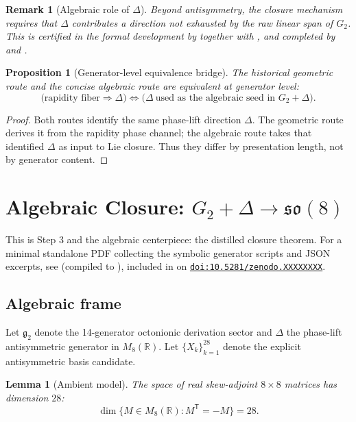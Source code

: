 \documentclass[11pt]{amsart}
\newtheorem{lemma}[theorem]{Lemma}
\newtheorem{proposition}[theorem]{Proposition}
\newtheorem{remark}[theorem]{Remark}
\newcommand{\PaperZenodoDoi}{10.5281/zenodo.XXXXXXXX}
\newcommand{\PaperArtifactBundleZip}{\path{paper_refs_bundle_2026-05-06.zip}}
\newcommand{\PaperZenodoDeposit}{\href{https://doi.org/\PaperZenodoDoi}{\texttt{doi:\PaperZenodoDoi}}}
\begin{document}
\begin{remark}[Algebraic role of \(\Delta\)]
Beyond antisymmetry, the closure mechanism requires that \(\Delta\) contributes a direction not exhausted by the raw linear span of \(G_2\). This is certified in the formal development by  together with , and completed by  and .
\end{remark}

\begin{proposition}[Generator-level equivalence bridge]
The historical geometric route and the concise algebraic route are equivalent at generator level:
\[
\bigl(\text{rapidity fiber}\Rightarrow \Delta\bigr)
\Longleftrightarrow
\bigl(\Delta\ \text{used as the algebraic seed in }G_2+\Delta\bigr).
\]
\end{proposition}

\begin{proof}
Both routes identify the same phase-lift direction \(\Delta\). The geometric route derives it from the rapidity phase channel; the algebraic route takes that identified \(\Delta\) as input to Lie closure. Thus they differ by presentation length, not by generator content.
\end{proof}

\section{Algebraic Closure: \texorpdfstring{$G_2+\Delta\to\mathfrak{so}(8)$}{G2 + Delta to so(8)}}
\label{sec:closure}
This is Step 3 and the algebraic centerpiece: the distilled closure theorem. For a minimal standalone PDF collecting the symbolic generator scripts and JSON excerpts, see  (compiled to ), included in \PaperArtifactBundleZip{} on \PaperZenodoDeposit.

\subsection{Algebraic frame}
Let $\mathfrak g_2$ denote the 14-generator octonionic derivation sector and $\Delta$ the phase-lift antisymmetric generator in $M_8(\mathbb R)$.
Let $\{X_k\}_{k=1}^{28}$ denote the explicit antisymmetric basis candidate.

\begin{lemma}[Ambient model]
The space of real skew-adjoint $8\times8$ matrices has dimension $28$:
\[
\dim\{M\in M_8(\mathbb R):M^{\mathsf T}=-M\}=28.
\]
\end{lemma}
\end{document}
